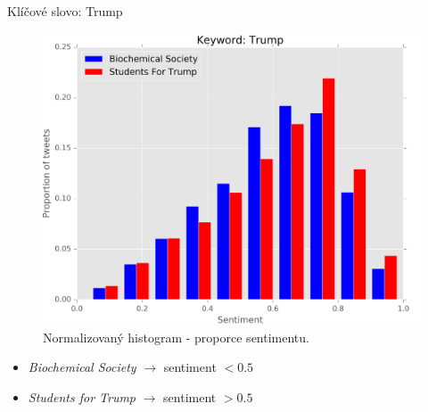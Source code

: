 \documentclass[notheorems,12pt]{beamer}
\begin{document}
\begin{frame}{Klíčové slovo: Trump}
    \begin{figure}
        \centering
        \includegraphics[scale=0.37]{./Pics/trump-normed.png}
        \vspace{-0.2cm}
        \caption*{Normalizovaný histogram - proporce sentimentu.}
    \end{figure}
    \vspace{-0.4cm}
	\begin{itemize}
        \item \textit{Biochemical Society} $\rightarrow$ sentiment $< 0.5$
		\item \textit{Students for Trump} $\rightarrow$ sentiment $> 0.5$
	\end{itemize}
\end{frame}
\end{document}
